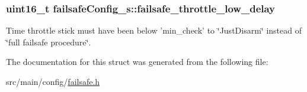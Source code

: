 \hypertarget{structfailsafeConfig__s_ab66ba821dd2e8b4fbc1e148c9fe4459d}{
\subsubsection[{failsafe\+\_\+throttle\+\_\+low\+\_\+delay}]{\setlength{\rightskip}{0pt plus 5cm}uint16\+\_\+t failsafe\+Config\+\_\+s\+::failsafe\+\_\+throttle\+\_\+low\+\_\+delay}}\label{structfailsafeConfig__s_ab66ba821dd2e8b4fbc1e148c9fe4459d}


Time throttle stick must have been below 'min\+\_\+check' to \char`\"{}\+Just\+Disarm\char`\"{} instead of \char`\"{}full failsafe procedure\char`\"{}. 



The documentation for this struct was generated from the following file\+:\begin{DoxyCompactItemize}
\item 
src/main/config/\hyperlink{config_2failsafe_8h}{failsafe.\+h}\end{DoxyCompactItemize}

